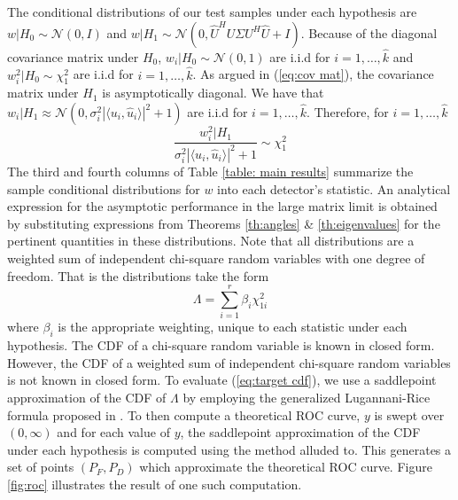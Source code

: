 The conditional distributions of our test samples under each hypothesis are $w|H_0\sim\mathcal{N}(0,I)$ and $w|H_1\sim\mathcal{N}(0,\widehat{U}^HU\Sigma U^H\widehat{U}+I)$. Because of the diagonal covariance matrix under $H_0$, $w_i|H_0\sim\mathcal{N}(0,1)$ are i.i.d for $i=1,\dots,\widehat{k}$ and $w_i^2|H_0\sim\chi_1^2$ are i.i.d for $i=1,\dots,\widehat{k}$. As argued in (\ref{eq:cov mat}), the covariance matrix under $H_1$ is asymptotically diagonal. We have that $w_i|H_1\approx\mathcal{N}(0,\sigma^2_i|\langle u_i,\widehat{u}_i\rangle|^2+1)$ are i.i.d for $i=1,\dots,\widehat{k}$. Therefore, for $i=1,\dots,\widehat{k}$
\begin{equation*}
\frac{w_i^2|H_1}{\sigma^2_i|\langle u_i,\widehat{u}_i\rangle|^2+1}\sim\chi_1^2
\end{equation*}
The third and fourth columns of Table \ref{table: main results} summarize the sample conditional distributions for $w$ into each detector's statistic.  An analytical expression for the asymptotic performance in the large matrix limit  is obtained by substituting expressions from Theorems \ref{th:angles} \& \ref{th:eigenvalues} for the pertinent quantities in these distributions. Note that all distributions are a weighted sum of independent chi-square random variables with one degree of freedom. That is the distributions take the form
\begin{equation*}
\Lambda = \sum_{i=1}^r\beta_i\chi^2_{1i}
\end{equation*}
where $\beta_i$ is the appropriate weighting, unique to each statistic under each hypothesis. The CDF of a chi-square random variable is known in closed form. However, the CDF of a weighted sum of independent chi-square random variables is not known in closed form. To evaluate (\ref{eq:target cdf}), we use a saddlepoint approximation of the CDF of $\Lambda$ by employing the generalized Lugannani-Rice formula proposed in \cite{wood1993saddlepoint}. To then compute a theoretical ROC curve, $y$ is swept over $(0,\infty)$ and for each value of $y$, the saddlepoint approximation of the CDF under each hypothesis is computed using the method alluded to. This generates a set of points $(P_F,P_D)$ which approximate the theoretical ROC curve. Figure \ref{fig:roc} illustrates the result of one such computation.

